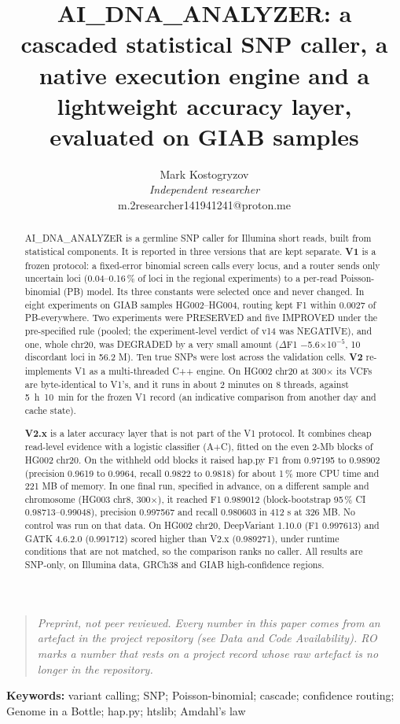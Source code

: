 \documentclass[11pt,a4paper]{article}
\title{\sffamily\bfseries\Large\color{ink} AI\_DNA\_ANALYZER: a cascaded statistical SNP caller, a native execution engine and a lightweight accuracy layer, evaluated on GIAB samples}
\author{\normalsize Mark Kostogryzov\\[2pt]\small\textit{Independent researcher}\\[2pt]\small m.2researcher141941241@proton.me}
\date{}
\makeatletter
\newcommand{\needspace}[1]{\par\ifdim\pagegoal=\maxdimen\else\dimen@=\pagegoal\advance\dimen@-\pagetotal\ifdim\dimen@<#1\relax\newpage\fi\fi}
\makeatother
\begin{document}
\maketitle
\thispagestyle{fancy}
\begin{quote}\small \emph{Preprint, not peer reviewed. Every number in this paper comes from an artefact in the project repository (see Data and Code Availability). RO marks a number that rests on a project record whose raw artefact is no longer in the repository.}\end{quote}

\begin{abstract}
AI\_DNA\_ANALYZER is a germline SNP caller for Illumina short reads, built from statistical components. It is reported in three versions that are kept separate. \textbf{V1} is a frozen protocol: a fixed-error binomial screen calls every locus, and a router sends only uncertain loci (0.04--0.16\,\% of loci in the regional experiments) to a per-read Poisson-binomial (PB) model. Its three constants were selected once and never changed. In eight experiments on GIAB samples HG002--HG004, routing kept F1 within 0.0027 of PB-everywhere. Two experiments were PRESERVED and five IMPROVED under the pre-specified rule (pooled; the experiment-level verdict of v14 was NEGATIVE), and one, whole chr20, was DEGRADED by a very small amount ($\Delta$F1 $-$5.6$\times$10$^{-5}$, 10 discordant loci in 56.2 M). Ten true SNPs were lost across the validation cells. \textbf{V2} re-implements V1 as a multi-threaded C++ engine. On HG002 chr20 at 300$\times$ its VCFs are byte-identical to V1's, and it runs in about 2 minutes on 8 threads, against 5~h~10~min for the frozen V1 record (an indicative comparison from another day and cache state).

\textbf{V2.x} is a later accuracy layer that is not part of the V1 protocol. It combines cheap read-level evidence with a logistic classifier (A+C), fitted on the even 2-Mb blocks of HG002 chr20. On the withheld odd blocks it raised hap.py F1 from 0.97195 to 0.98902 (precision 0.9619 to 0.9964, recall 0.9822 to 0.9818) for about 1\,\% more CPU time and 221 MB of memory. In one final run, specified in advance, on a different sample and chromosome (HG003 chr8, 300$\times$), it reached F1 0.989012 (block-bootstrap 95\,\% CI 0.98713--0.99048), precision 0.997567 and recall 0.980603 in 412 s at 326 MB. No control was run on that data. On HG002 chr20, DeepVariant 1.10.0 (F1 0.997613) and GATK 4.6.2.0 (0.991712) scored higher than V2.x (0.989271), under runtime conditions that are not matched, so the comparison ranks no caller. All results are SNP-only, on Illumina data, GRCh38 and GIAB high-confidence regions.

\end{abstract}
\noindent\textbf{Keywords:} variant calling; SNP; Poisson-binomial; cascade; confidence routing; Genome in a Bottle; hap.py; htslib; Amdahl's law\par\bigskip
\FloatBarrier
\needspace{10\baselineskip}
\end{document}
